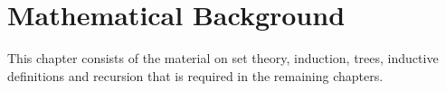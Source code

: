 \chapter{Mathematical Background}
\label{MathematicalBackground}

This chapter consists of the material on set theory, induction, trees,
inductive definitions and recursion that is required in the remaining
chapters.




